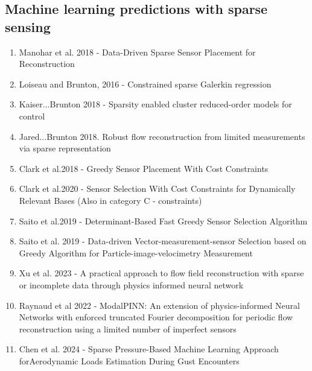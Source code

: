 \documentclass[%
 reprint,
 amsmath,amssymb,
 aps,
]{revtex4-2}
\begin{document}
\subsection{Machine learning predictions with sparse sensing}
\begin{enumerate}
    \item Manohar et al. 2018 - Data-Driven Sparse Sensor Placement for Reconstruction
    \item Loiseau and Brunton, 2016 - Constrained sparse Galerkin regression
    \item Kaiser...Brunton 2018 - Sparsity enabled cluster reduced-order models for control
    \item Jared...Brunton 2018. Robust flow reconstruction from limited measurements via sparse representation
    \item Clark et al.2018 - Greedy Sensor Placement With Cost Constraints
    \item Clark et al.2020 - Sensor Selection With Cost Constraints for Dynamically Relevant Bases   (Also in category C - constraints)
    \item Saito et al.2019 - Determinant-Based Fast Greedy Sensor Selection Algorithm
    \item Saito et al. 2019 - Data-driven Vector-measurement-sensor Selection based on Greedy Algorithm for Particle-image-velocimetry Measurement
    \item Xu et al. 2023 - A practical approach to flow field reconstruction with sparse or incomplete data through physics informed neural network
    \item Raynaud et al 2022 - ModalPINN: An extension of physics-informed Neural Networks with enforced truncated Fourier decomposition for periodic flow reconstruction using a limited number of imperfect sensors
    \item Chen et al. 2024 - Sparse Pressure-Based Machine Learning Approach forAerodynamic Loads Estimation During Gust Encounters
    
\end{enumerate}
\end{document}
